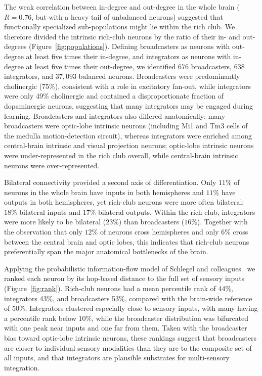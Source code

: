 \documentclass[11pt]{article}
\begin{document}
The weak correlation between in-degree and out-degree in the whole brain
($R = 0.76$, but with a heavy tail of unbalanced neurons) suggested that
functionally specialized sub-populations might lie within the rich club.
We therefore divided the intrinsic rich-club neurons by the ratio of their
in- and out-degrees (Figure~\ref{fig:populations}). Defining broadcasters
as neurons with out-degree at least five times their in-degree, and
integrators as neurons with in-degree at least five times their
out-degree, we identified $676$ broadcasters, $638$ integrators, and
$37{,}093$ balanced neurons. Broadcasters were predominantly cholinergic
(75\%), consistent with a role in excitatory fan-out, while integrators
were only 49\% cholinergic and contained a disproportionate fraction of
dopaminergic neurons, suggesting that many integrators may be engaged
during learning. Broadcasters and integrators also differed anatomically:
many broadcasters were optic-lobe intrinsic neurons (including Mi1 and Tm3
cells of the medulla motion-detection circuit), whereas integrators were
enriched among central-brain intrinsic and visual projection neurons;
optic-lobe intrinsic neurons were under-represented in the rich club
overall, while central-brain intrinsic neurons were over-represented.

Bilateral connectivity provided a second axis of differentiation. Only
$11\%$ of neurons in the whole brain have inputs in both hemispheres and
$11\%$ have outputs in both hemispheres, yet rich-club neurons were more
often bilateral: $18\%$ bilateral inputs and $17\%$ bilateral outputs.
Within the rich club, integrators were more likely to be bilateral
($23\%$) than broadcasters ($16\%$). Together with the observation that
only $12\%$ of neurons cross hemispheres and only $6\%$ cross between the
central brain and optic lobes, this indicates that rich-club neurons
preferentially span the major anatomical bottlenecks of the brain.

Applying the probabilistic information-flow model of Schlegel and
colleagues~\cite{dorkenwald2024flywire,schlegel2024whole} we ranked each
neuron by its hop-based distance to the full set of sensory inputs
(Figure~\ref{fig:rank}). Rich-club neurons had a mean percentile rank of
44\%, integrators 43\%, and broadcasters 53\%, compared with the
brain-wide reference of 50\%. Integrators clustered especially close to
sensory inputs, with many having a percentile rank below $10\%$, while
the broadcaster distribution was bifurcated with one peak near inputs and
one far from them. Taken with the broadcaster bias toward optic-lobe
intrinsic neurons, these rankings suggest that broadcasters are closer to
individual sensory modalities than they are to the composite set of all
inputs, and that integrators are plausible substrates for multi-sensory
integration.
\end{document}
